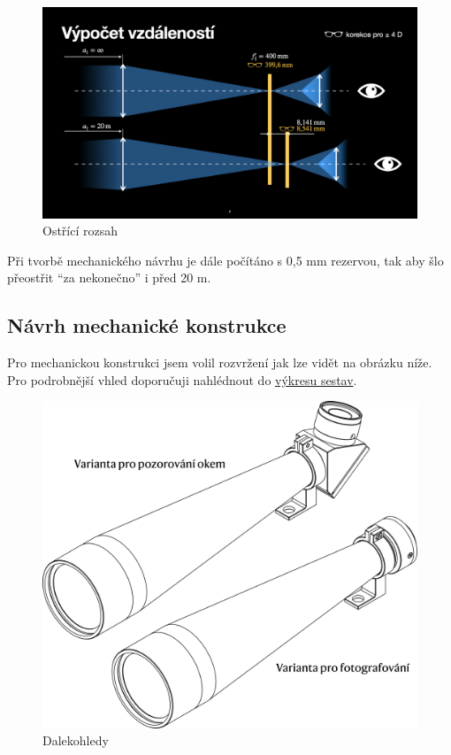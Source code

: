 \documentclass[
]{article}
\begin{document}
\begin{figure}
\centering
\includegraphics{imgs/rozsah.png}
\caption{Ostřící rozsah}
\end{figure}

Při tvorbě mechanického návrhu je dále počítáno s 0,5 mm rezervou, tak
aby šlo přeostřit ``za nekonečno'' i před 20 m.

\hypertarget{nuxe1vrh-mechanickuxe9-konstrukce}{%
\subsection{Návrh mechanické
konstrukce}\label{nuxe1vrh-mechanickuxe9-konstrukce}}

Pro mechanickou konstrukci jsem volil rozvržení jak lze vidět na obrázku
níže. Pro podrobnější vhled doporučuji nahlédnout do
\href{CAD/drawings/TKC_000.pdf}{výkresu sestav}.

\begin{figure}
\centering
\includegraphics{imgs/dalekohledy_1.png}
\caption{Dalekohledy}
\end{figure}
\end{document}
